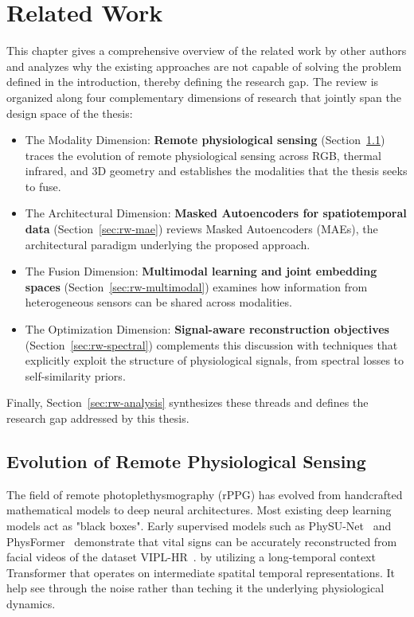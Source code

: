 \chapter{Related Work}
\label{ch:relatedwork}
This chapter gives a comprehensive overview of the related work by other authors
and analyzes why the existing approaches are not capable of solving the problem
defined in the introduction, thereby defining the research gap. The review is
organized along four complementary dimensions of research that jointly span the
design space of the thesis:
\begin{itemize}
    \item The Modality Dimension: \textbf{Remote physiological sensing} (Section~\ref{sec:rw-sensing})
    traces the evolution of remote physiological sensing across RGB, thermal
    infrared, and 3D geometry and establishes the modalities that the thesis
    seeks to fuse.
    \item The Architectural Dimension: \textbf{Masked Autoencoders for spatiotemporal data}
    (Section~\ref{sec:rw-mae}) reviews Masked Autoencoders (MAEs), the
    architectural paradigm underlying the proposed approach.
    \item The Fusion Dimension: \textbf{Multimodal learning and joint embedding spaces}
    (Section~\ref{sec:rw-multimodal}) examines how information from
    heterogeneous sensors can be shared across modalities.
    \item The Optimization Dimension: \textbf{Signal-aware reconstruction objectives} (Section~\ref{sec:rw-spectral})
    complements this discussion with techniques that explicitly exploit the
    structure of physiological signals, from spectral losses to self-similarity
    priors.
\end{itemize}
Finally, Section~\ref{sec:rw-analysis} synthesizes these threads and defines
the research gap addressed by this thesis.

\section{Evolution of Remote Physiological Sensing}
\label{sec:rw-sensing}
The field of remote photoplethysmography (rPPG) has evolved from handcrafted
mathematical models to deep neural architectures. Most existing deep learning models act as "black boxes".
Early supervised models such as PhySU-Net~\cite{savic2024physunet} and PhysFormer~\cite{yu2022physformerfacialvideobasedphysiological} 
demonstrate that vital signs can be accurately reconstructed from facial videos of the dataset VIPL-HR~\cite{niu2018viplhrmultimodaldatabasepulse}.
by utilizing a long-temporal context Transformer that operates on intermediate spatital temporal representations. It help see through the 
noise rather than teching it the underlying physiological dynamics.

